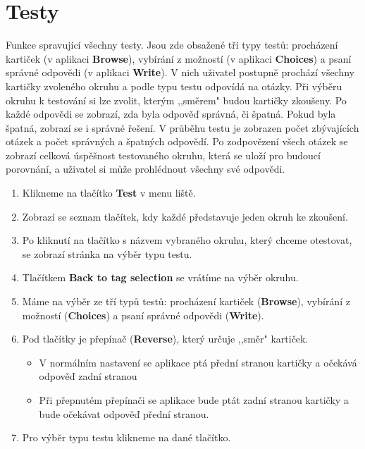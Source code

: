 \documentclass[11pt]{article}
\providecommand{\tightlist}{\setlength{\itemsep}{1pt}\setlength{\parskip}{1pt}}
\begin{document}
\hypertarget{testy}{%
\section{Testy}\label{testy}}

Funkce spravující všechny testy. Jsou zde obsažené tři typy testů:
procházení kartiček (v aplikaci \textbf{Browse}), vybírání z možností (v
aplikaci \textbf{Choices}) a psaní správné odpovědi (v aplikaci
\textbf{Write}). V nich uživatel postupně prochází všechny kartičky
zvoleného okruhu a podle typu testu odpovídá na otázky. Při výběru
okruhu k testování si lze zvolit, kterým ,,směrem" budou kartičky
zkoušeny. Po každé odpovědi se zobrazí, zda byla odpověď správná, či
špatná. Pokud byla špatná, zobrazí se i správné řešení. V průběhu testu
je zobrazen počet zbývajících otázek a počet správných a špatných
odpovědí. Po zodpovězení všech otázek se zobrazí celková úspěšnost
testovaného okruhu, která se uloží pro budoucí porovnání, a uživatel si
může prohlédnout všechny své odpovědi.

\begin{enumerate}
\def\labelenumi{\arabic{enumi}.}
\tightlist
\item
  Klikneme na tlačítko \textbf{Test} v menu liště.
\item
  Zobrazí se seznam tlačítek, kdy každé představuje jeden okruh ke
  zkoušení.
\item
  Po kliknutí na tlačítko s názvem vybraného okruhu, který chceme
  otestovat, se zobrazí stránka na výběr typu testu.
\item
  Tlačítkem \textbf{Back to tag selection} se vrátíme na výběr okruhu.
\item
  Máme na výběr ze tří typů testů: procházení kartiček
  (\textbf{Browse}), vybírání z možností (\textbf{Choices}) a psaní
  správné odpovědi (\textbf{Write}).
\item
  Pod tlačítky je přepínač (\textbf{Reverse}), který určuje ,,směr"
  kartiček.

  \begin{itemize}
  \tightlist
  \item
    V normálním nastavení se aplikace ptá přední stranou kartičky a
    očekává odpověď zadní stranou
  \item
    Při přepnutém přepínači se aplikace bude ptát zadní stranou kartičky
    a bude očekávat odpověď přední stranou.
  \end{itemize}
\item
  Pro výběr typu testu klikneme na dané tlačítko.
\end{enumerate}
\end{document}
